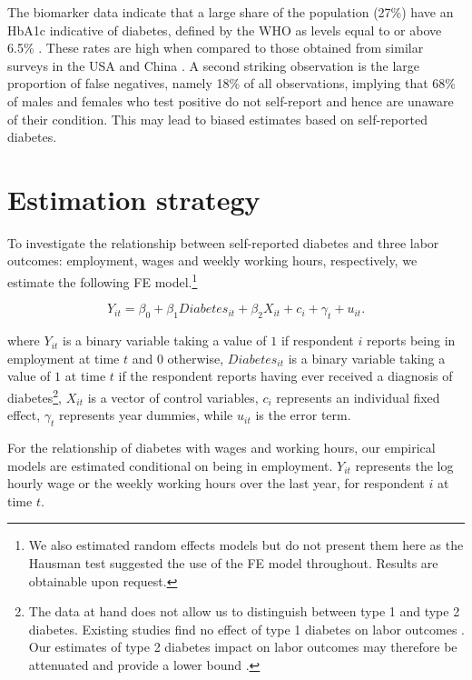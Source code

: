 \documentclass[12pt,english]{article}
\begin{document}
The biomarker data indicate that a large share of the population (27\%) have an \ac{HbA1c} indicative of diabetes, defined by the \ac{WHO} as levels equal to or above 6.5\% \parencite{WorldHealthOrganization2011}. These rates are high when compared to those obtained from similar surveys in the USA and China \parencite{Frankenberg2015}. A second striking observation is the large proportion of false negatives, namely 18\% of all observations, implying that 68\% of males and females who test positive do not self-report and hence are unaware of their condition. This may lead to biased estimates based on self-reported diabetes.





\section{\label{sec:Estimation Strategy}Estimation strategy}


\textit{}

To investigate the relationship between self-reported diabetes and three labor outcomes: employment, wages and weekly working hours, respectively, we estimate the following \acf{FE} model.\footnote{We also estimated random effects models but do not present them here as the Hausman test suggested the use of the FE model throughout. Results are obtainable upon request.}


\noindent 
\begin{equation}
Y_{it}=\beta_{0}+\beta_{1}Diabetes_{it}+\beta_{2}X_{it}+c_{i}+\gamma_{t}+u_{it}.\label{eq:cha4_employed}
\end{equation}


where $Y_{it}$ is a binary variable taking a value of $1$ if respondent $i$ reports being in employment at time $t$ and $0$ otherwise, $Diabetes_{it}$ is a binary variable taking a value of $1$ at time $t$ if the respondent reports having ever received a diagnosis of diabetes\footnote{The data at hand does not allow us to distinguish between type 1 and type 2 diabetes. Existing studies find no effect of type 1 diabetes on labor outcomes . Our estimates of type 2 diabetes impact on labor outcomes may therefore be attenuated and provide a lower bound \parencite{Minor2011,Minor2015}.}, $X_{it}$ is a vector of control variables, $c_{i}$ represents an individual fixed effect, $\gamma_{t}$ represents year dummies, while $u_{it}$ is the error term.

For the relationship of diabetes with wages and working hours, our empirical models are estimated conditional on being in employment. $Y_{it}$ represents the log hourly wage or the weekly working hours over the last year, for respondent $i$ at time $t$.
\end{document}
